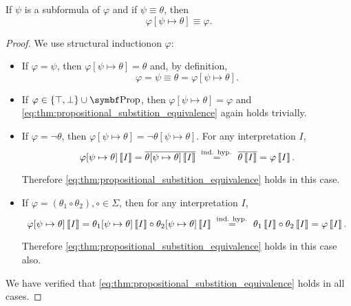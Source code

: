 \begin{proposition}\label{thm:propositional_substition_equivalence}
  If \( \psi \) is a subformula of \( \varphi \) and if \( \psi \equiv \theta \), then
  \begin{equation}\label{eq:thm:propositional_substition_equivalence}
    \varphi[\psi \mapsto \theta] \equiv \varphi.
  \end{equation}
\end{proposition}
\begin{proof}
  We use structural induction\IND on \( \varphi \):

  \begin{itemize}
    \item If \( \varphi = \psi \), then \( \varphi[\psi \mapsto \theta] = \theta \) and, by definition,
    \begin{equation*}
      \varphi = \psi \equiv \theta = \varphi[\psi \mapsto \theta].
    \end{equation*}

    \item If \( \varphi \in \{ \top, \bot \} \cup \Bold{Prop} \), then \( \varphi[\psi \mapsto \theta] = \varphi \) and \eqref{eq:thm:propositional_substition_equivalence} again holds trivially.

    \item If \( \varphi = \neg \theta \), then \( \varphi[\psi \mapsto \theta] = \neg \theta[\psi \mapsto \theta] \). For any interpretation \( I \),
    \begin{equation*}
      \varphi[\psi \mapsto \theta]\left\llbracket I \right\rrbracket
      =
      \overline{\theta[\psi \mapsto \theta]\left\llbracket I \right\rrbracket}
      \overset {\text{ ind. hyp. }} =
      \overline{\theta\left\llbracket I \right\rrbracket}
      =
      \varphi\left\llbracket I \right\rrbracket.
    \end{equation*}

    Therefore \eqref{eq:thm:propositional_substition_equivalence} holds in this case.

    \item If \( \varphi = (\theta_1 \circ \theta_2), \circ \in \Sigma \), then for any interpretation \( I \),
    \begin{equation*}
      \varphi[\psi \mapsto \theta]\left\llbracket I \right\rrbracket
      =
      \theta_1[\psi \mapsto \theta]\left\llbracket I \right\rrbracket \circ \theta_2[\psi \mapsto \theta]\left\llbracket I \right\rrbracket
      \overset {\text{ ind. hyp. }} =
      \theta_1\left\llbracket I \right\rrbracket \circ \theta_2\left\llbracket I \right\rrbracket
      =
      \varphi\left\llbracket I \right\rrbracket.
    \end{equation*}

    Therefore \eqref{eq:thm:propositional_substition_equivalence} holds in this case also.
  \end{itemize}

  We have verified that \eqref{eq:thm:propositional_substition_equivalence} holds in all cases.
\end{proof}

